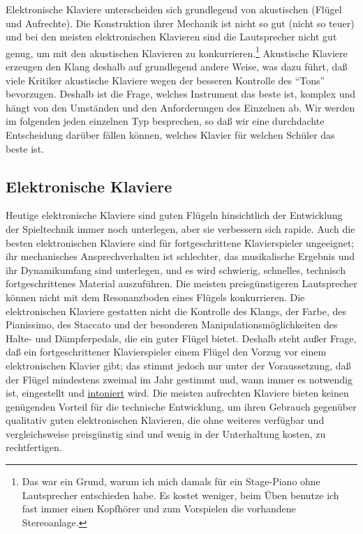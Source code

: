 Elektronische Klaviere unterscheiden sich grundlegend von akustischen (Flügel und Aufrechte).
Die Konstruktion ihrer Mechanik ist nicht so gut (nicht so teuer) und bei den meisten elektronischen Klavieren sind die Lautsprecher nicht gut genug, um mit den akustischen Klavieren zu konkurrieren.\footnote{Das war ein Grund, warum ich mich damals für ein Stage-Piano ohne Lautsprecher entschieden habe.
Es kostet weniger, beim Üben benutze ich fast immer einen Kopfhörer und zum Vorspielen die vorhandene Stereoanlage.}
Akustische Klaviere erzeugen den Klang deshalb auf grundlegend andere Weise, was dazu führt, daß viele Kritiker akustische Klaviere wegen der besseren Kontrolle des \enquote{Tons} bevorzugen.
Deshalb ist die Frage, welches Instrument das beste ist, komplex und hängt von den Umständen und den Anforderungen des Einzelnen ab.
Wir werden im folgenden jeden einzelnen Typ besprechen, so daß wir eine durchdachte Entscheidung darüber fällen können, welches Klavier für welchen Schüler das beste ist.

 
\subsection{Elektronische Klaviere}\hypertarget{c1iii17b}{}

Heutige elektronische Klaviere sind guten Flügeln hinsichtlich der Entwicklung der Spieltechnik immer noch 
unterlegen, aber sie verbessern sich rapide.
Auch die besten elektronischen Klaviere sind für fortgeschrittene Klavierspieler ungeeignet; ihr mechanisches Ansprechverhalten ist schlechter, das musikalische Ergebnis und ihr Dynamikumfang sind unterlegen, und es wird schwierig, schnelles, technisch fortgeschrittenes Material auszuführen.
Die meisten preisgünstigeren Lautsprecher können nicht mit dem Resonanzboden eines Flügels konkurrieren.
Die elektronischen Klaviere gestatten nicht die Kontrolle des Klangs, der Farbe, des Pianissimo, des Staccato und der besonderen Manipulationsmöglichkeiten des Halte- und Dämpferpedals, die ein guter Flügel bietet.
Deshalb steht außer Frage, daß ein fortgeschrittener Klavierspieler einem Flügel den Vorzug vor einem elektronischen Klavier gibt; das stimmt jedoch nur unter der Voraussetzung, daß der Flügel mindestens zweimal im Jahr gestimmt und, wann immer es notwendig ist, eingestellt und \hyperlink{c2_7_hamm}{intoniert} wird.
Die meisten aufrechten Klaviere bieten keinen genügenden Vorteil für die technische Entwicklung, um ihren Gebrauch gegenüber qualitativ guten elektronischen Klavieren, die ohne weiteres verfügbar und vergleichsweise preisgünstig sind und wenig in der Unterhaltung kosten, zu rechtfertigen.

